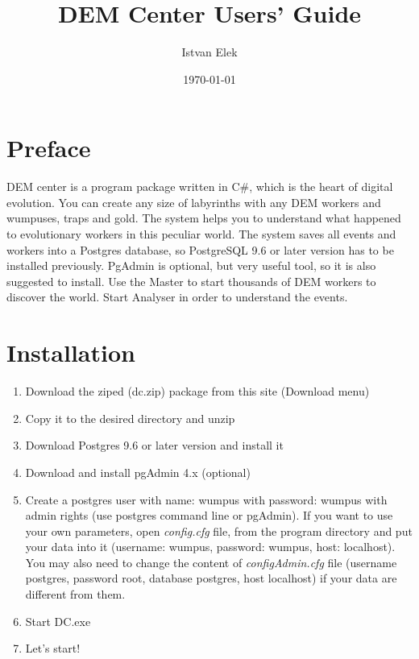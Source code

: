 \documentclass[a4paper,12pt]{article}
\begin{document}
\author{Istvan Elek}
\title{DEM Center Users' Guide}
\date{\today}


\maketitle
\newpage
\tableofcontents
\newpage


\section{Preface}

DEM center is a program package written in C\#, which is the heart of digital evolution. You can create any size of labyrinths with any DEM workers and wumpuses, traps and gold. The system  helps you to understand what happened to  evolutionary workers in this peculiar world. The system saves all events and workers into a Postgres database, so PostgreSQL 9.6 or later version has to be installed previously. PgAdmin is optional, but very useful tool, so it is also suggested to install. Use the Master to start thousands of DEM workers to discover the world. Start Analyser in order to understand the events.



\section{Installation}

\begin{enumerate}
	\item Download the ziped (dc.zip) package from this site (Download menu)
	\item Copy it to the desired directory and unzip
	\item Download Postgres 9.6 or later version and install it
	\item Download and install pgAdmin 4.x (optional)
	\item Create a postgres user with name: wumpus with password: wumpus with admin rights (use postgres command line or pgAdmin). If you want to use your own parameters, open \textit{config.cfg} file, from the program directory and put your data into it (username: wumpus,	password: wumpus, 	host: localhost). You may also need to change the content of \textit{configAdmin.cfg} file (username postgres, password root, database postgres, host localhost) if your data are different from them.
	\item Start DC.exe
	\item Let's start!
\end{enumerate}
\end{document}
